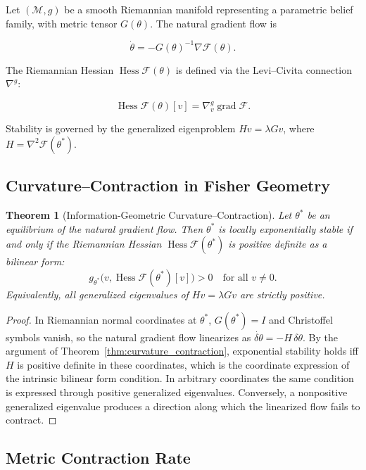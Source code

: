 \documentclass[11pt]{article}
\newtheorem{theorem}{Theorem}
\theoremstyle{remark}
\begin{document}
Let $(\mathcal{M}, g)$ be a smooth Riemannian manifold representing a parametric belief family, with metric tensor $G(\theta)$. The natural gradient flow is

\[
\dot{\theta} = - G(\theta)^{-1}\nabla \mathcal{F}(\theta).
\]

The Riemannian Hessian $\operatorname{Hess}\mathcal{F}(\theta)$ is defined via the Levi--Civita connection $\nabla^g$:

\[
\operatorname{Hess}\mathcal{F}(\theta)[v] = \nabla^{\!g}_v \operatorname{grad}\mathcal{F}.
\]

Stability is governed by the generalized eigenproblem $H v = \lambda G v$, where $H = \nabla^2\mathcal{F}(\theta^*)$.

\subsection{Curvature--Contraction in Fisher Geometry}

\begin{theorem}[Information-Geometric Curvature--Contraction]
\label{thm:info_curvature_contraction}
Let $\theta^*$ be an equilibrium of the natural gradient flow. Then $\theta^*$ is locally exponentially stable if and only if the Riemannian Hessian $\operatorname{Hess}\mathcal{F}(\theta^*)$ is positive definite as a bilinear form:
\[
g_{\theta^*}\big(v,\operatorname{Hess}\mathcal{F}(\theta^*)[v]\big) > 0
\quad \text{for all } v \neq 0.
\]
Equivalently, all generalized eigenvalues of $H v = \lambda G v$ are strictly positive.
\end{theorem}

\begin{proof}
In Riemannian normal coordinates at $\theta^*$, $G(\theta^*) = I$ and Christoffel symbols vanish, so the natural gradient flow linearizes as $\dot{\delta\theta} = -H\,\delta\theta$. By the argument of Theorem~\ref{thm:curvature_contraction}, exponential stability holds iff $H$ is positive definite in these coordinates, which is the coordinate expression of the intrinsic bilinear form condition. In arbitrary coordinates the same condition is expressed through positive generalized eigenvalues. Conversely, a nonpositive generalized eigenvalue produces a direction along which the linearized flow fails to contract.
\end{proof}

\subsection{Metric Contraction Rate}
\end{document}
